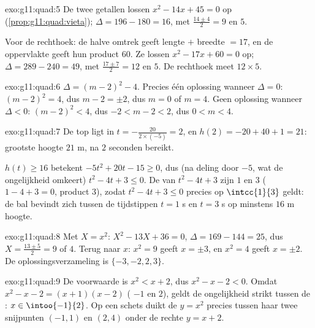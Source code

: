 \begin{solution}{exo:g11:quad:5}
De twee getallen lossen $x^2 - 14x + 45 = 0$ op
(\cref{prop:g11:quad:vieta}); $\Delta = 196 - 180 = 16$, met 
$\frac{14 \pm 4}{2} = 9$ en $5$.

Voor de rechthoek: de halve omtrek geeft lengte $+$ breedte $= 17$, en de
oppervlakte geeft hun product $60$. Ze lossen $x^2 - 17x + 60 = 0$ op;
$\Delta = 289 - 240 = 49$, met  $\frac{17 \pm 7}{2} = 12$ en $5$. De
rechthoek meet $12 \times 5$.
\end{solution}

\begin{solution}{exo:g11:quad:6}
$\Delta = (m-2)^2 - 4$. Precies één oplossing wanneer $\Delta = 0$:
$(m-2)^2 = 4$, dus $m - 2 = \pm 2$, dus $m = 0$ of $m = 4$. Geen oplossing
wanneer $\Delta < 0$: $(m-2)^2 < 4$, dus $-2 < m - 2 < 2$, dus
$0 < m < 4$.
\end{solution}

\begin{solution}{exo:g11:quad:7}
De top ligt in $t = -\frac{20}{2 \times (-5)} = 2$, en
$h(2) = -20 + 40 + 1 = 21$: grootste hoogte $21$ m, na $2$ seconden bereikt.

$h(t) \geq 16$ betekent $-5t^2 + 20t - 15 \geq 0$, dus (na deling door $-5$,
wat de ongelijkheid omkeert) $t^2 - 4t + 3 \leq 0$. De  van
$t^2-4t+3$ zijn $1$ en $3$ ($1 - 4 + 3 = 0$, product $3$), zodat
$t^2 - 4t + 3 \leq 0$ precies op $\intcc{1}{3}$ geldt: de bal bevindt zich
tussen de tijdstippen $t = 1$ s en $t = 3$ s op minstens $16$ m hoogte.
\end{solution}

\begin{solution}{exo:g11:quad:8}
Met $X = x^2$: $X^2 - 13X + 36 = 0$, $\Delta = 169 - 144 = 25$, dus
$X = \frac{13 \pm 5}{2} = 9$ of $4$. Terug naar $x$: $x^2 = 9$ geeft
$x = \pm 3$, en $x^2 = 4$ geeft $x = \pm 2$. De oplossingsverzameling is
$\{-3, -2, 2, 3\}$.
\end{solution}

\begin{solution}{exo:g11:quad:9}
De voorwaarde is $x^2 < x + 2$, dus $x^2 - x - 2 < 0$. Omdat
$x^2 - x - 2 = (x+1)(x-2)$ ( $-1$ en $2$), geldt de ongelijkheid
strikt tussen de : $x \in \intoo{-1}{2}$. Op een schets duikt de
 $y = x^2$ precies tussen haar twee snijpunten $(-1, 1)$ en $(2, 4)$
onder de rechte $y = x+2$.
\end{solution}

